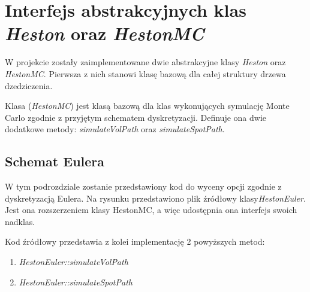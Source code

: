 \documentclass{pracamgr}
\begin{document}
\section{Interfejs abstrakcyjnych klas \textit{Heston} oraz \textit{HestonMC}}
W projekcie zostały zaimplementowane dwie abstrakcyjne klasy \textit{Heston} oraz \textit{HestonMC}.
Pierwsza z nich stanowi klasę bazową dla całej struktury drzewa dzedziczenia. 
Klasa (\textit{HestonMC})
jest klasą bazową dla klas wykonujących symulację Monte Carlo zgodnie z 
przyjętym schematem dyskretyzacji. Definuje ona dwie dodatkowe metody: \textit{simulateVolPath} oraz 
\textit{simulateSpotPath}.




\clearpage
\subsection{Schemat Eulera}

W tym podrozdziale zostanie przedstawiony kod do wyceny opcji zgodnie z dyskretyzacją Eulera.
Na rysunku przedstawiono plik źródłowy klasy\textit{HestonEuler}. Jest ona rozszerzeniem klasy 
HestonMC, a więc udostępnia ona interfejs swoich nadklas. 



Kod źródłowy \label{lst:Eulercpp} przedstawia z kolei implementację 2 powyższych metod:
\begin{enumerate}
  \item \textit{HestonEuler::simulateVolPath}
  \item \textit{HestonEuler::simulateSpotPath}
\end{enumerate}
\end{document}
